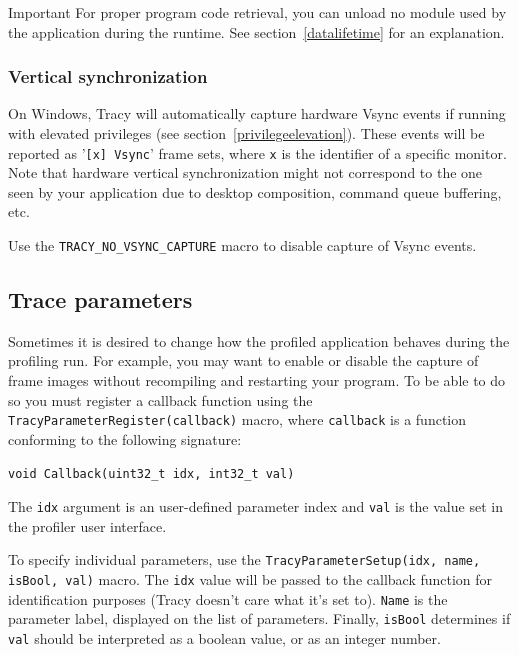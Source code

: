 \documentclass[hidelinks,titlepage,a4paper]{article}
\begin{document}
\begin{bclogo}[
noborder=true,
couleur=black!5,
logo=\bcbombe
]{Important}
For proper program code retrieval, you can unload no module used by the application during the runtime. See section~\ref{datalifetime} for an explanation.
\end{bclogo}

\subsubsection{Vertical synchronization}

On Windows, Tracy will automatically capture hardware Vsync events if running with elevated privileges (see section~\ref{privilegeelevation}). These events will be reported as '\texttt{[x] Vsync}' frame sets, where \texttt{x} is the identifier of a specific monitor. Note that hardware vertical synchronization might not correspond to the one seen by your application due to desktop composition, command queue buffering, etc.

Use the \texttt{TRACY\_NO\_VSYNC\_CAPTURE} macro to disable capture of Vsync events.

\subsection{Trace parameters}
\label{traceparameters}

Sometimes it is desired to change how the profiled application behaves during the profiling run. For example, you may want to enable or disable the capture of frame images without recompiling and restarting your program. To be able to do so you must register a callback function using the \texttt{TracyParameterRegister(callback)} macro, where \texttt{callback} is a function conforming to the following signature:

\begin{lstlisting}
void Callback(uint32_t idx, int32_t val)
\end{lstlisting}

The \texttt{idx} argument is an user-defined parameter index and \texttt{val} is the value set in the profiler user interface.

To specify individual parameters, use the \texttt{TracyParameterSetup(idx, name, isBool, val)} macro. The \texttt{idx} value will be passed to the callback function for identification purposes (Tracy doesn't care what it's set to). \texttt{Name} is the parameter label,  displayed on the list of parameters. Finally, \texttt{isBool} determines if \texttt{val} should be interpreted as a boolean value, or as an integer number.
\end{document}
